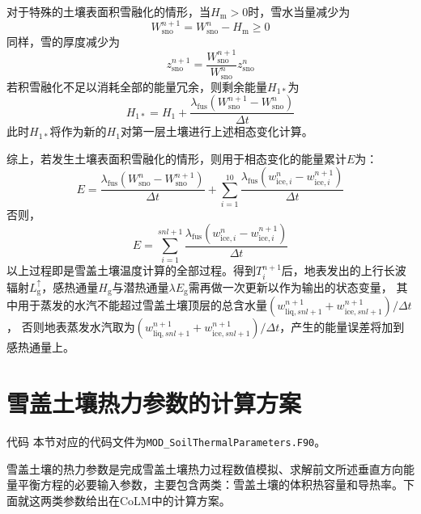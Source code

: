 对于特殊的土壤表面积雪融化的情形，当$H_{\mathrm {m}} >0$时，雪水当量减少为
\begin{equation}
  W_{\mathrm{sno}}^{n+1}=W_{\mathrm{s no}}^{n}-H_{\mathrm{m}} \geqslant 0
\end{equation}
同样，雪的厚度减少为
\begin{equation}
  z_{\mathrm{sno}}^{n+1}=\frac{W_{\mathrm{sno}}^{n+1}}{W_{\mathrm{sno}}^{n}} z_{\mathrm{sno}}^{n}
\end{equation}
若积雪融化不足以消耗全部的能量冗余，则剩余能量$H_{1\ast}$为
\begin{equation}
  H_{1 *}=H_{1}+\frac{\lambda_{\mathrm {fus}}\left(W_{\mathrm{sno}}^{n+1}-W_{\mathrm{sno}}^{n}\right)}{\Delta t}
\end{equation}
此时$H_{1\ast}$将作为新的$H_1$对第一层土壤进行上述相态变化计算。


综上，若发生土壤表面积雪融化的情形，则用于相态变化的能量累计$E$为：
\begin{equation}
  E=\frac{\lambda_{\mathrm {fus}}\left(W_{\mathrm{sno}}^{n}-W_{\mathrm{sno}}^{n+1}\right)}{\Delta t}+\sum_{i=1}^{10} \frac{\lambda_{\mathrm {fus}}\left(w_{\mathrm{ice},i}^{n}-w_{\mathrm{ice},i}^{n+1}\right)}{\Delta t}
\end{equation}
否则，
\begin{equation}
  E=\sum_{i=1}^{s n l+1} \frac{\lambda_{\mathrm {fus}}\left(w_{\mathrm{ice},i}^{n}-w_{\mathrm{ice},i}^{n+1}\right)}{\Delta t}
\end{equation}
以上过程即是雪盖土壤温度计算的全部过程。得到$T_i^{n+1}$后，地表发出的上行长波辐射$L_{\mathrm {g}} ^\uparrow$，感热通量$H_{\mathrm {g}} $与潜热通量$\lambda E_{\mathrm {g}} $需再做一次更新以作为输出的状态变量，
其中用于蒸发的水汽不能超过雪盖土壤顶层的总含水量$\left(w_{\mathrm{liq},snl+1}^{n+1}+w_{\mathrm{ice},snl+1}^{n+1}\right)/\Delta t$，
否则地表蒸发水汽取为$\left(w_{\mathrm{liq},snl+1}^{n+1}+w_{\mathrm{ice},snl+1}^{n+1}\right)/\Delta t$，产生的能量误差将加到感热通量上。


\section{雪盖土壤热力参数的计算方案}\label{sec_thermalpar}
\begin{mymdframed}{代码}
  本节对应的代码文件为\texttt{MOD\_SoilThermalParameters.F90}。
\end{mymdframed}

雪盖土壤的热力参数是完成雪盖土壤热力过程数值模拟、求解前文所述垂直方向能量平衡方程的必要输入参数，主要包含两类：雪盖土壤的体积热容量和导热率。下面就这两类参数给出在CoLM中的计算方案。


